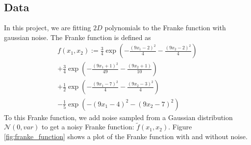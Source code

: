\subsection{Data} \label{subsec:data_linear_regression}
In this project, we are fitting $2D$ polynomials to the Franke function with gaussian noise. The Franke function is defined as
\begin{equation}
    \begin{split}
        f(x_1,x_2) := \frac{3}{4}\exp{\left(-\frac{(9x_1-2)^2}{4}-\frac{(9x_2-2)^2}{4}\right)} \\ + \frac{3}{4}\exp{\left(-\frac{(9x_1+1)^2}{49}-\frac{(9x_2+1)}{10}\right)} \\+ \frac{1}{2}\exp{\left(-\frac{(9x_1-7)^2}{4}-\frac{(9x_2-3)^2}{4}\right)} \\ - \frac{1}{5}\exp{\left(-(9x_1-4)^2-(9x_2-7)^2 \right)}
    \end{split}
\end{equation}
To this Franke function, we add noise sampled from a Gaussian distribution $\mathcal{N}(0, var)$ to get a noisy Franke function:  $\tilde{f}(x_1,x_2)$. Figure \ref{fig:franke_function} shows a plot of the Franke function with and without noise.
